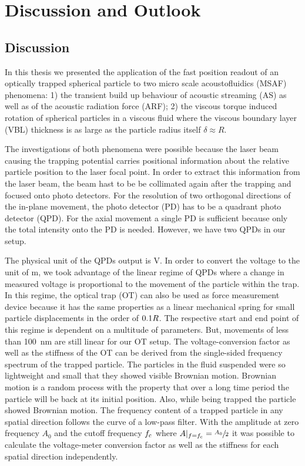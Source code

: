 \chapter[Discussion \& Outlook]{Discussion and Outlook}\label{ch:discussion}

\section{Discussion}
In this thesis we presented the application of the fast position readout of an 
optically trapped spherical particle to two micro scale acoustofluidics (MSAF) 
phenomena: 1) the transient build up behaviour of acoustic streaming (AS) as 
well as of the acoustic radiation force (ARF); 2) the viscous torque induced 
rotation of spherical particles in a viscous fluid where the viscous boundary 
layer (VBL) thickness is as large as the particle radius itself $\delta \approx 
R$.

The investigations of both phenomena were possible because the laser beam 
causing the trapping potential carries positional information about the 
relative particle position to the laser focal point. In order to extract this 
information from the laser beam, the beam hast to be be collimated again after 
the trapping and focused onto photo detectors. For the resolution of two 
orthogonal directions of the in-plane movement, the photo detector (PD) has to 
be a quadrant photo detector (QPD). For the axial movement a single PD is 
sufficient because only the total intensity onto the PD is needed. However, we 
have two QPDs in our setup.

The physical unit of the QPDs output is \si{\volt}. In order to convert the 
voltage to the unit of \si{\meter}, we took advantage of the linear regime of 
QPDs where a change in measured voltage is proportional to the movement of the 
particle within the trap. In this regime, the optical trap (OT) can also be 
used as force measurement device because it has the same properties as a linear 
mechanical spring for small particle displacements in the order of $0.1R$. 
The respective start and end point of this regime is dependent on a multitude 
of parameters. But, movements of less than \SI{100}{\nm} are still linear for 
our OT setup. The voltage-conversion factor as well as the stiffness of the OT 
can be derived from the single-sided frequency spectrum of the trapped 
particle. The particles in the fluid suspended were so lightweight and small 
that they showed visible Brownian motion. Brownian motion is a random process 
with the property that over a long time period the particle will be back at its 
initial position. Also, while being trapped the particle showed Brownian 
motion. The frequency content of a trapped particle in any spatial direction 
follows the curve of a low-pass filter. With the amplitude at zero frequency 
$A_{0}$ and the cutoff frequency $f_{\mathrm{c}}$ where 
$A\vert_{f=f_{\mathrm{c}}}=\sfrac{A_{0}}{2}$ it was possible to calculate the 
voltage-meter conversion factor as well as the stiffness for each spatial 
direction independently.

